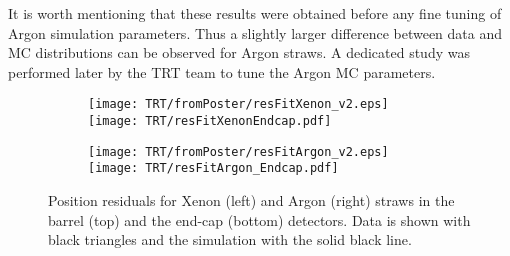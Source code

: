It is worth mentioning that these results were obtained before any fine tuning of Argon simulation parameters. Thus a slightly larger difference between data and MC distributions can be observed for Argon straws. A dedicated study was performed later by the TRT team to tune the Argon MC parameters.

\begin{figure}

\begin{subfigure}{.5\textwidth}
  \centering
  \texttt{[image: TRT/fromPoster/resFitXenon\_v2.eps]}
  \texttt{[image: TRT/resFitXenonEndcap.pdf]}
\end{subfigure}%
\begin{subfigure}{.5\textwidth}
  \centering
  \texttt{[image: TRT/fromPoster/resFitArgon\_v2.eps]}
  \texttt{[image: TRT/resFitArgon\_Endcap.pdf]}
\end{subfigure}

\caption{Position residuals for Xenon (left) and Argon (right) straws in the barrel (top) and the end-cap (bottom) detectors. Data is shown with black triangles and the
simulation with the solid black line.}
  \label{fig:resFit}
\end{figure}


